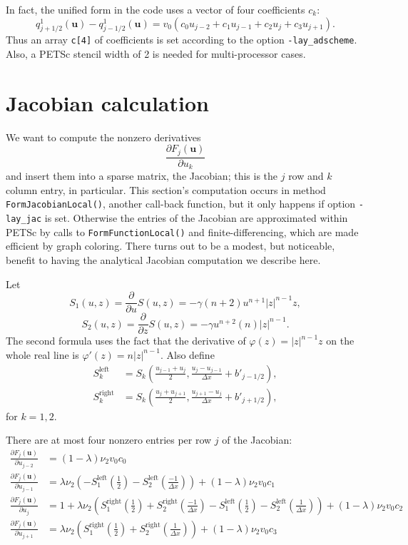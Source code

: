 \documentclass[11pt]{amsart}
\newcommand\bu{\mathbf{u}}
\begin{document}
\medskip
In fact, the unified form in the code uses a vector of four coefficients $c_k$:
\begin{equation}
   q^1_{j+1/2}(\bu) - q^1_{j-1/2}(\bu) = v_0 \left( c_0 u_{j-2} + c_1 u_{j-1} + c_2 u_j + c_3 u_{j+1} \right). \label{eq:dfluxunified}
\end{equation}
Thus an array \verb|c[4]| of coefficients is set according to the option \verb|-lay_adscheme|.  Also, a PETSc stencil width of 2 is needed for multi-processor cases.


\section{Jacobian calculation}

We want to compute the nonzero derivatives
   $$\frac{\partial F_j(\bu)}{\partial u_k}$$
and insert them into a sparse matrix, the Jacobian; this is the $j$ row and $k$ column entry, in particular.  This section's computation occurs in method \verb|FormJacobianLocal()|, another call-back function, but it only happens if option \verb|-lay_jac| is set.  Otherwise the entries of the Jacobian are approximated within PETSc by calls to \verb|FormFunctionLocal()| and finite-differencing, which are made efficient by graph coloring.  There turns out to be a modest, but noticeable, benefit to having the analytical Jacobian computation we describe here.

Let
	$$S_1(u,z) = \frac{\partial}{\partial u} S(u,z) = - \gamma (n+2) u^{n+1} |z|^{n-1} z,$$
	$$S_2(u,z) = \frac{\partial}{\partial z} S(u,z) = - \gamma u^{n+2} (n) |z|^{n-1}.$$
The second formula uses the fact that the derivative of $\varphi(z) = |z|^{n-1} z$ on the whole real line is $\varphi'(z) = n |z|^{n-1}$.  Also define
\begin{align*}
S_k^{\text{left}} &= S_k\left(\frac{u_{j-1}+u_j}{2},\frac{u_j-u_{j-1}}{\Delta x} + b'_{j-1/2}\right), \\
S_k^{\text{right}} &= S_k\left(\frac{u_j+u_{j+1}}{2},\frac{u_{j+1}-u_j}{\Delta x} + b'_{j+1/2}\right),
\end{align*}
for $k=1,2$.

There are at most four nonzero entries per row $j$ of the Jacobian:
\begin{align*}
\frac{\partial F_j(\bu)}{\partial u_{j-2}} &= (1-\lambda) \nu_2 v_0 c_0 \\
\frac{\partial F_j(\bu)}{\partial u_{j-1}} &= \lambda \nu_2 \left( - S_1^{\text{left}} (\tfrac{1}{2}) - S_2^{\text{left}} (\tfrac{-1}{\Delta x}) \right) + (1-\lambda) \nu_2 v_0 c_1 \\
\frac{\partial F_j(\bu)}{\partial u_j} &= 1 + \lambda \nu_2 \left( S_1^{\text{right}} (\tfrac{1}{2}) + S_2^{\text{right}} (\tfrac{-1}{\Delta x}) - S_1^{\text{left}} (\tfrac{1}{2}) - S_2^{\text{left}} (\tfrac{1}{\Delta x}) \right) + (1-\lambda) \nu_2 v_0 c_2 \\
\frac{\partial F_j(\bu)}{\partial u_{j+1}} &= \lambda \nu_2 \left( S_1^{\text{right}} (\tfrac{1}{2}) + S_2^{\text{right}} (\tfrac{1}{\Delta x}) \right) + (1-\lambda) \nu_2 v_0 c_3
\end{align*}



%
%
\end{document}
